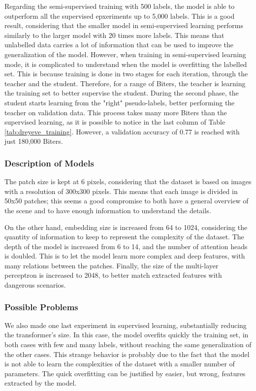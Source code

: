 Regarding the semi-supervised training with 500 labels, the model is able to 
outperform all the supervised epxeriments up to 5,000 labels. This is a good 
result, considering that the smaller model in semi-supervised learning performs 
similarly to the larger model with 20 times more labels. This means that 
unlabelled data carries a lot of information that can be used to improve the 
generalization of the model.
However, when training in semi-supervised learning mode, it is complicated 
to understand when the model is overfitting the labelled set. This is because 
training is done in two stages for each iteration, through the teacher and the 
student. Therefore, for a range of Biters, the teacher is learning the training 
set to better supervise the student. During the second phase, the student 
starts learning from the "right" pseudo-labels, better performing the teacher 
on validation data.
This process takes many more Biters than the supervised learning, as it is 
possible to notice in the last column of Table \ref{tab:dreyeve_training}.
However, a validation accuracy of 0.77 is reached with just 180,000 Biters.

\subsubsection{Description of Models}
The patch size is kept at 6 pixels, considering that the dataset is based on 
images with a resolution of 300x300 pixels. This means that each image is 
divided in 50x50 patches; this seems a good compromise to both have a general 
overview of the scene and to have enough information to understand the details.

On the other hand, embedding size is increased from 64 to 1024, considering the 
quantity of information to keep to represent the complexity of the dataset.
The depth of the model is increased from 6 to 14, and the number of attention 
heads is doubled. This is to let the model learn more complex and deep features, 
with many relations between the patches. Finally, the size of the multi-layer
perceptron is increased to 2048, to better match extracted features with 
dangerous scenarios.


\subsubsection{Possible Problems}
We also made one last experiment in supervised learning, substantially reducing 
the transformer's size. In this case, the model overfits quickly the training 
set, in both cases with few and many labels, without reaching the same generalization of 
the other cases. This strange behavior is probably due to the fact that the 
model is not able to learn the complexities of the dataset with a smaller 
number of parameters. The quick overfitting can be justified by easier, but 
wrong, features extracted by the model.


